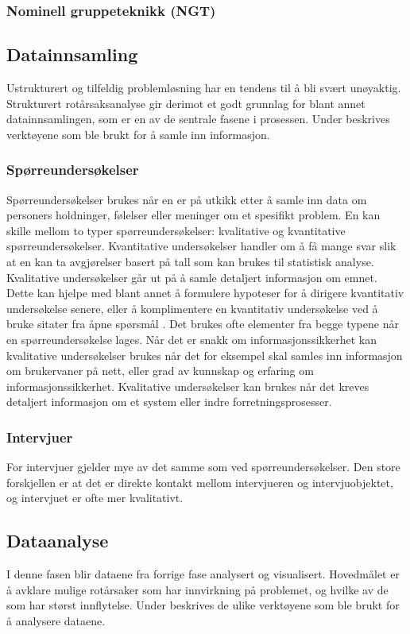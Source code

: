 \subsubsection{Nominell gruppeteknikk (NGT)}


\subsection{Datainnsamling}
Ustrukturert og tilfeldig problemløsning har en tendens til å bli svært unøyaktig. Strukturert rotårsaksanalyse gir derimot et godt grunnlag for blant annet datainnsamlingen, som er en av de sentrale fasene i prosessen. Under beskrives verktøyene som ble brukt for å samle inn informasjon. 

\subsubsection{Spørreundersøkelser}
Spørreundersøkelser brukes når en er på utkikk etter å samle inn data om personers holdninger, følelser eller meninger om et spesifikt problem. En kan skille mellom to typer spørreundersøkelser: kvalitative og kvantitative spørreundersøkelser. Kvantitative undersøkelser handler om å få mange svar slik at en kan ta avgjørelser basert på tall som kan brukes til statistisk analyse. Kvalitative undersøkelser går ut på å samle detaljert informasjon om emnet. Dette kan hjelpe med blant annet å formulere hypoteser for å dirigere kvantitativ undersøkelse senere, eller å komplimentere en kvantitativ undersøkelse ved å bruke sitater fra åpne spørsmål \cite{KvalKvant}. Det brukes ofte elementer fra begge typene når en spørreundersøkelse lages. Når det er snakk om informasjonssikkerhet kan kvalitative undersøkelser brukes når det for eksempel skal samles inn informasjon om brukervaner på nett, eller grad av kunnskap og erfaring om informasjonssikkerhet. Kvalitative undersøkelser kan brukes når det kreves detaljert informasjon om et system eller indre forretningsprosesser. 

\subsubsection{Intervjuer}
For intervjuer gjelder mye av det samme som ved spørreundersøkelser. Den store forskjellen er at det er direkte kontakt mellom intervjueren og intervjuobjektet, og intervjuet er ofte mer kvalitativt. 

\subsection{Dataanalyse}
I denne fasen blir dataene fra forrige fase analysert og visualisert. Hovedmålet er å avklare mulige rotårsaker som har innvirkning på problemet, og hvilke av de som har størst innflytelse. Under beskrives de ulike verktøyene som ble brukt for å analysere dataene.

